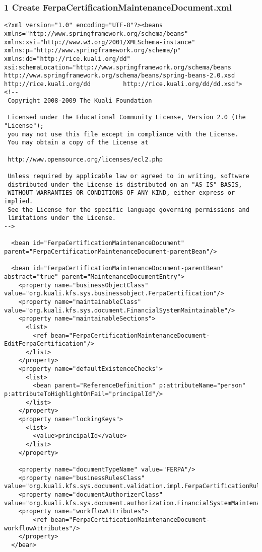 \subsubsection*{1 Create FerpaCertificationMaintenanceDocument.xml}
\begin{verbatim}
<?xml version="1.0" encoding="UTF-8"?><beans xmlns="http://www.springframework.org/schema/beans" xmlns:xsi="http://www.w3.org/2001/XMLSchema-instance" xmlns:p="http://www.springframework.org/schema/p" xmlns:dd="http://rice.kuali.org/dd" xsi:schemaLocation="http://www.springframework.org/schema/beans         http://www.springframework.org/schema/beans/spring-beans-2.0.xsd         http://rice.kuali.org/dd         http://rice.kuali.org/dd/dd.xsd">
<!--
 Copyright 2008-2009 The Kuali Foundation
 
 Licensed under the Educational Community License, Version 2.0 (the "License");
 you may not use this file except in compliance with the License.
 You may obtain a copy of the License at
 
 http://www.opensource.org/licenses/ecl2.php
 
 Unless required by applicable law or agreed to in writing, software
 distributed under the License is distributed on an "AS IS" BASIS,
 WITHOUT WARRANTIES OR CONDITIONS OF ANY KIND, either express or implied.
 See the License for the specific language governing permissions and
 limitations under the License.
-->

  <bean id="FerpaCertificationMaintenanceDocument" parent="FerpaCertificationMaintenanceDocument-parentBean"/>

  <bean id="FerpaCertificationMaintenanceDocument-parentBean" abstract="true" parent="MaintenanceDocumentEntry">
    <property name="businessObjectClass" value="org.kuali.kfs.sys.businessobject.FerpaCertification"/>
    <property name="maintainableClass" value="org.kuali.kfs.sys.document.FinancialSystemMaintainable"/>
    <property name="maintainableSections">
      <list>
        <ref bean="FerpaCertificationMaintenanceDocument-EditFerpaCertification"/>
      </list>
    </property>
    <property name="defaultExistenceChecks">
      <list>
        <bean parent="ReferenceDefinition" p:attributeName="person" p:attributeToHighlightOnFail="principalId"/>
      </list>
    </property>
    <property name="lockingKeys">
      <list>
        <value>principalId</value>
      </list>
    </property>
            
    <property name="documentTypeName" value="FERPA"/>
    <property name="businessRulesClass" value="org.kuali.kfs.sys.document.validation.impl.FerpaCertificationRule"/>
    <property name="documentAuthorizerClass" value="org.kuali.kfs.sys.document.authorization.FinancialSystemMaintenanceDocumentAuthorizerBase"/>
    <property name="workflowAttributes">
    	<ref bean="FerpaCertificationMaintenanceDocument-workflowAttributes"/>
    </property>
  </bean>


\end{verbatim}
